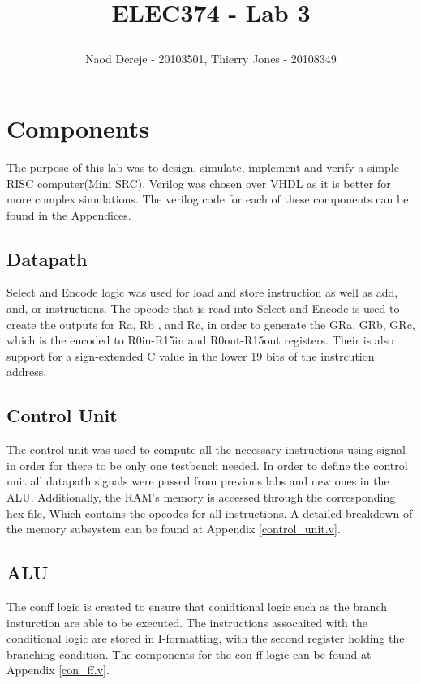 \documentclass{article}
\title{
    \begin{large}
        ELEC374 - Lab 3
    \end{large}
}
\author{Naod Dereje - 20103501, Thierry Jones - 20108349}
\begin{document}
\maketitle
\cleardoublepage
\tableofcontents
\cleardoublepage

\section{Components}
    The purpose of this lab was to design, simulate, implement and verify a simple RISC computer(Mini SRC). 
    Verilog was chosen over VHDL as it is better for more complex simulations. The verilog code for each of these components can be found in the Appendices.
    
    \subsection{Datapath}
    Select and Encode logic was used for load and store instruction as well as add, and, or instructions. The opcode that is read into Select and Encode is used to create the outputs for Ra, Rb , and Rc, in order to generate the GRa, GRb, GRc, which is the encoded to R0in-R15in and R0out-R15out registers. Their is also support for a sign-extended C value in the lower 19 bits of the instrcution address.

    \subsection{Control Unit}
    The control unit was used to compute all the necessary instructions using signal in order for there to be only one testbench needed.
    In order to define the control unit all datapath signals were passed from previous labs and new ones in the ALU. Additionally, the RAM's memory is 
    accessed through the corresponding hex file, Which contains the opcodes for all instructions.
    A detailed breakdown of the memory subsystem can be found at Appendix \ref{control_unit.v}.

    \subsection{ALU}
    The conff logic is created to ensure that conidtional logic such as the branch insturction are able to be executed. The instructions assocaited with the conditional logic 
    are stored in I-formatting, with the second register holding the branching condition. The components for the con ff logic can be found at Appendix \ref{con_ff.v}.
\end{document}
